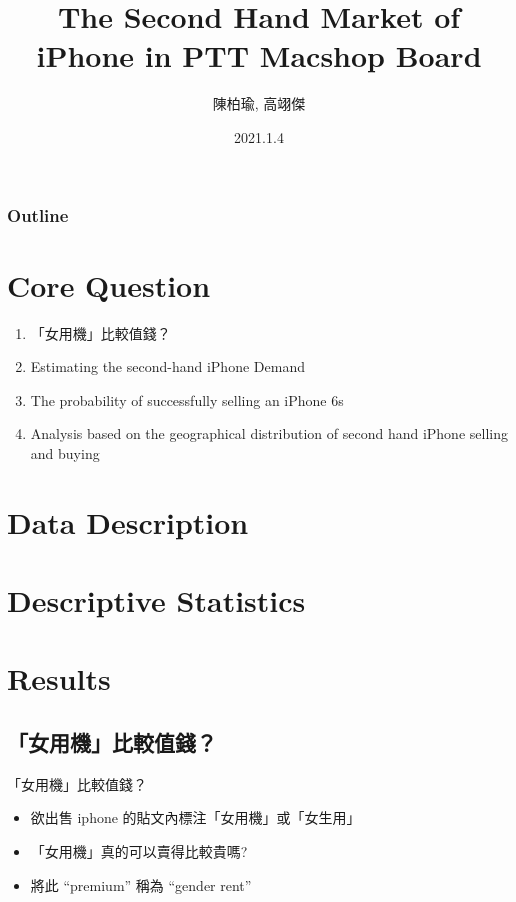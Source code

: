 \documentclass[11pt]{beamer}
\title{The Second Hand Market of iPhone in PTT Macshop Board}
\author{陳柏瑜, 高翊傑}
\institute[NTU Econ]{\scshape 109-1 ECON-DSSI\\ NTU ECON}
\date{2021.1.4}
\begin{document}
\begin{frame}
\titlepage
\end{frame}

\begin{frame}
\frametitle{Outline}
\tableofcontents
\end{frame}


\section{Core Question}

	\begin{enumerate}
		\item 「女用機」比較值錢？
		\item Estimating the second-hand iPhone Demand
		\item The probability of successfully selling an iPhone 6s
		\item Analysis based on the geographical distribution of second hand iPhone selling and buying
	\end{enumerate}

\section{Data Description} 

\section{Descriptive Statistics} 

\section{Results}


\subsection{「女用機」比較值錢？}
\begin{frame}[fragile]{「女用機」比較值錢？}

	\begin{itemize}
		\item 欲出售 iphone 的貼文內標注「女用機」或「女生用」
		\item 「女用機」真的可以賣得比較貴嗎?
		\item 將此 “premium” 稱為 “gender rent”
	\end{itemize}


\end{frame}
\end{document}
